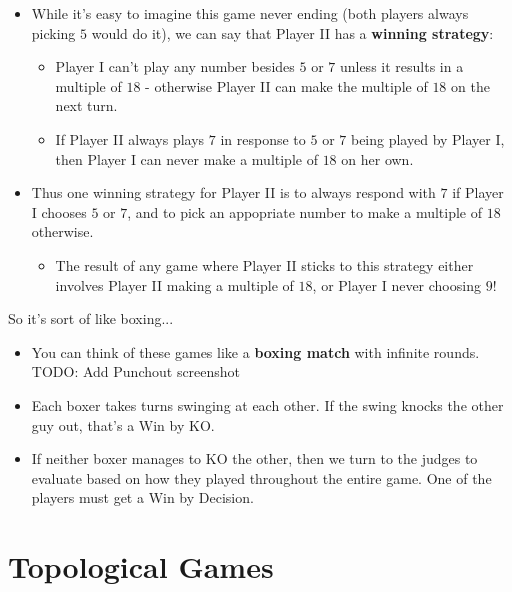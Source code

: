 \documentclass{beamer}
\begin{document}
\begin{frame}
  \begin{itemize}
  \item
    While it's easy to imagine this game never ending (both players always picking $5$ would do it), we can say that Player II has a \textbf{winning strategy}:
    \pause
    \begin{itemize}
      \item Player I can't play any number besides $5$ or $7$ unless it results in a multiple of $18$ - otherwise Player II can make the multiple of $18$ on the next turn.
      \pause
      \item If Player II always plays $7$ in response to $5$ or $7$ being played by Player I, then Player I can never make a multiple of $18$ on her own.
    \end{itemize}
  \pause
  \item 
    Thus one winning strategy for Player II is to always respond with $7$ if Player I chooses $5$ or $7$, and to pick an appopriate number to make a multiple of $18$ otherwise.
  \pause
    \begin{itemize}
      \item 
        The result of any game where Player II sticks to this strategy either involves Player II making a multiple of $18$, or Player I never choosing $9$!
    \end{itemize}
  \end{itemize}
\end{frame}

\begin{frame}{So it's sort of like boxing...}
  \begin{itemize}
  \item
    You can think of these games like a \textbf{boxing match} with infinite rounds. TODO: Add Punchout screenshot
  \pause
  \item
    Each boxer takes turns swinging at each other. If the swing knocks the other guy out, that's a Win by KO.
  \pause
  \item
    If neither boxer manages to KO the other, then we turn to the judges to evaluate based on how they played throughout the entire game. One of the players must get a Win by Decision.
  \end{itemize}
\end{frame}

\section{Topological Games}
\end{document}
